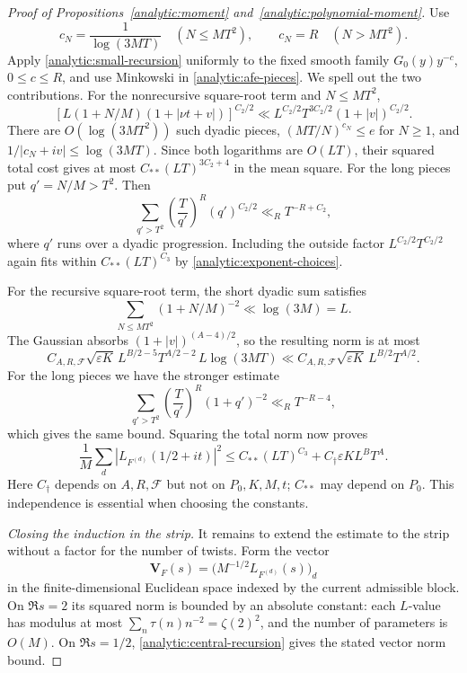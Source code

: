 \begin{proof}[Proof of Propositions~\ref{analytic:moment} and~\ref{analytic:polynomial-moment}]
Use
\[
 c_N=\frac1{\log(3MT)}\quad(N\leq MT^2),\qquad
 c_N=R\quad(N>MT^2).
\]
Apply \eqref{analytic:small-recursion} uniformly to the fixed smooth
family $G_0(y)y^{-c}$, $0\leq c\leq R$, and use Minkowski in
\eqref{analytic:afe-pieces}. We spell out the two contributions.
For the nonrecursive square-root term and $N\leq MT^2$,
\[
 [L(1+N/M)(1+|\nu t+v|)]^{C_2/2}
 \ll L^{C_2/2}T^{3C_2/2}(1+|v|)^{C_2/2}.
\]
There are $O(\log(3MT^2))$ such dyadic pieces,
$(MT/N)^{c_N}\leq e$ for $N\geq1$, and
$1/|c_N+iv|\leq\log(3MT)$.
Since both logarithms are $O(LT)$, their squared total cost gives
at most $C_{**}(LT)^{3C_2+4}$ in the mean square.
For the long pieces put $q'=N/M>T^2$. Then
\[
 \sum_{q'>T^2}\left(\frac T{q'}\right)^R(q')^{C_2/2}
 \ll_R T^{-R+C_2},
\]
where $q'$ runs over a dyadic progression. Including the outside
factor $L^{C_2/2}T^{C_2/2}$ again fits within
$C_{**}(LT)^{C_3}$ by \eqref{analytic:exponent-choices}.

For the recursive square-root term, the short dyadic sum satisfies
\[
 \sum_{N\leq MT^2}(1+N/M)^{-2}\ll\log(3M)=L.
\]
The Gaussian absorbs $(1+|v|)^{(A-4)/2}$, so the resulting norm is
at most
\[
 C_{A,R,\mathcal F}\sqrt{\varepsilon K}\,
 L^{B/2-5}T^{A/2-2}\,L\log(3MT)
 \ll C_{A,R,\mathcal F}\sqrt{\varepsilon K}\,
 L^{B/2}T^{A/2}.
\]
For the long pieces we have the stronger estimate
\begin{equation}\label{analytic:long-recursive-sum}
 \sum_{q'>T^2}\left(\frac T{q'}\right)^R(1+q')^{-2}
 \ll_R T^{-R-4},
\end{equation}
which gives the same bound. Squaring the total norm now proves
\begin{equation}\label{analytic:central-recursion}
 \frac1M\sum_d|L_{F^{(d)}}(1/2+it)|^2
 \leq C_{**}(LT)^{C_3}
       +C_{\dagger}\varepsilon K L^BT^A.
\end{equation}
Here $C_{\dagger}$ depends on $A,R,\mathcal F$ but not on $P_0,K,M,t$;
$C_{**}$ may depend on $P_0$. This independence is essential when
choosing the constants.

\smallskip
\noindent\emph{Closing the induction in the strip.}
It remains to extend the estimate to the strip without a factor for
the number of twists. Form the vector
\[
 \mathbf V_F(s)=\big(M^{-1/2}L_{F^{(d)}}(s)\big)_d
\]
in the finite-dimensional Euclidean space indexed by the current
admissible block. On $\Re s=2$ its squared norm is bounded by an
absolute constant: each $L$-value has modulus at most
$\sum_n\tau(n)n^{-2}=\zeta(2)^2$, and the number of parameters is
$O(M)$. On $\Re s=1/2$, \eqref{analytic:central-recursion} gives the
stated vector norm bound.


\end{proof}
